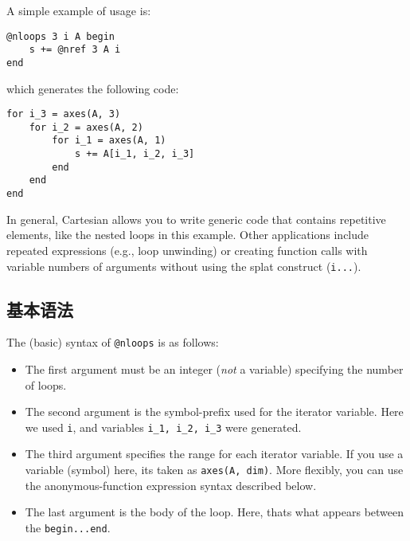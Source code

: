 A simple example of usage is:




\begin{verbatim}
@nloops 3 i A begin
    s += @nref 3 A i
end
\end{verbatim}



which generates the following code:




\begin{verbatim}
for i_3 = axes(A, 3)
    for i_2 = axes(A, 2)
        for i_1 = axes(A, 1)
            s += A[i_1, i_2, i_3]
        end
    end
end
\end{verbatim}



In general, Cartesian allows you to write generic code that contains repetitive elements, like the nested loops in this example.  Other applications include repeated expressions (e.g., loop unwinding) or creating function calls with variable numbers of arguments without using the {\textquotedbl}splat{\textquotedbl} construct (\texttt{i...}).



\hypertarget{3961768779038303546}{}


\subsection{基本语法}



The (basic) syntax of \texttt{@nloops} is as follows:



\begin{itemize}
\item The first argument must be an integer (\emph{not} a variable) specifying the number of loops.


\item The second argument is the symbol-prefix used for the iterator variable. Here we used \texttt{i}, and variables \texttt{i\_1, i\_2, i\_3} were generated.


\item The third argument specifies the range for each iterator variable. If you use a variable (symbol) here, it{\textquotesingle}s taken as \texttt{axes(A, dim)}. More flexibly, you can use the anonymous-function expression syntax described below.


\item The last argument is the body of the loop. Here, that{\textquotesingle}s what appears between the \texttt{begin...end}.

\end{itemize}


